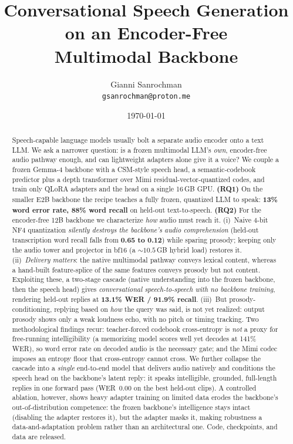 \documentclass[11pt]{article}
\title{Conversational Speech Generation on an Encoder-Free\\ Multimodal Backbone}
\author{Gianni Sanrochman\\ \texttt{gsanrochman@proton.me}}
\date{\today}
\begin{document}
\maketitle

\begin{abstract}
Speech-capable language models usually bolt a separate audio encoder onto a text
LLM. We ask a narrower question: is a frozen multimodal LLM's \emph{own},
encoder-free audio pathway enough, and can lightweight adapters alone give it a
voice? We couple a frozen Gemma-4 backbone with a CSM-style speech head, a
semantic-codebook predictor plus a depth transformer over Mimi
residual-vector-quantized codes, and train only QLoRA adapters and the head on a
single 16\,GB GPU. \textbf{(RQ1)} On the smaller E2B backbone the recipe teaches a
fully frozen, quantized LLM to speak: \textbf{13\% word error rate, 88\% word
recall} on held-out text-to-speech. \textbf{(RQ2)} For the encoder-free 12B
backbone we characterize \emph{how} audio must reach it. (i)~Naive 4-bit NF4
quantization \emph{silently destroys the backbone's audio comprehension} (held-out
transcription word recall falls from \textbf{0.65 to 0.12}) while sparing prosody;
keeping only the audio tower and projector in bf16 (a ${\sim}10.5$\,GB hybrid load)
restores it. (ii)~\emph{Delivery matters}: the native multimodal pathway conveys
lexical content, whereas a hand-built feature-splice of the same features conveys
prosody but not content. Exploiting these, a two-stage cascade (native
understanding into the frozen backbone, then the speech head) gives
\emph{conversational speech-to-speech with no backbone training}, rendering
held-out replies at \textbf{13.1\% WER / 91.9\% recall}. (iii)~But
prosody-conditioning, replying based on \emph{how} the query was said, is not yet
realized: output prosody shows only a weak loudness echo, with no pitch or timing
tracking. Two methodological findings recur: teacher-forced codebook cross-entropy
is \emph{not} a proxy for free-running intelligibility (a memorizing model scores
well yet decodes at 141\% WER), so word error rate on decoded audio is the
necessary gate; and the Mimi codec imposes an entropy floor that cross-entropy
cannot cross. We further collapse the cascade into a \emph{single} end-to-end model
that delivers audio natively and conditions the speech head on the backbone's latent
reply: it speaks intelligible, grounded, full-length replies in one forward pass
(WER~0.00 on the best held-out clips). A controlled ablation, however, shows heavy
adapter training on limited data erodes the backbone's out-of-distribution
competence: the frozen backbone's intelligence stays intact (disabling the adapter
restores it), but the adapter masks it, making robustness a data-and-adaptation
problem rather than an architectural one. Code, checkpoints, and data are released.
\end{abstract}
\end{document}
